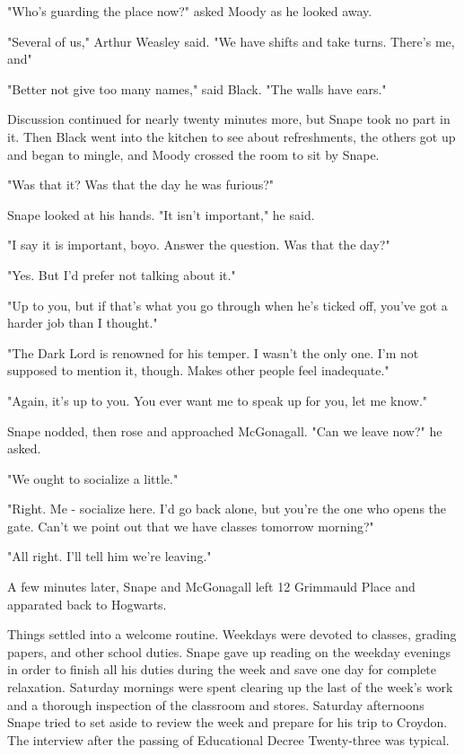 "Who's guarding the place now?" asked Moody as he looked away.

"Several of us," Arthur Weasley said. "We have shifts and take turns. There's me, and{\el}"

"Better not give too many names," said Black. "The walls have ears."

Discussion continued for nearly twenty minutes more, but Snape took no part in it. Then Black went into the kitchen to see about refreshments, the others got up and began to mingle, and Moody crossed the room to sit by Snape.

"Was that it? Was that the day he was furious?"

Snape looked at his hands. "It isn't important," he said.

"I say it is important, boyo. Answer the question. Was that the day?"

"Yes. But I'd prefer not talking about it."

"Up to you, but if that's what you go through when he's ticked off, you've got a harder job than I thought."

"The Dark Lord is renowned for his temper. I wasn't the only one. I'm not supposed to mention it, though. Makes other people feel inadequate."

"Again, it's up to you. You ever want me to speak up for you, let me know."

Snape nodded, then rose and approached McGonagall. "Can we leave now?" he asked.

"We ought to socialize a little."

"Right. Me - socialize here. I'd go back alone, but you're the one who opens the gate. Can't we point out that we have classes tomorrow morning?"

"All right. I'll tell him we're leaving."

A few minutes later, Snape and McGonagall left 12 Grimmauld Place and apparated back to Hogwarts.

\sbreak

Things settled into a welcome routine. Weekdays were devoted to classes, grading papers, and other school duties. Snape gave up reading on the weekday evenings in order to finish all his duties during the week and save one day for complete relaxation. Saturday mornings were spent clearing up the last of the week's work and a thorough inspection of the classroom and stores. Saturday afternoons Snape tried to set aside to review the week and prepare for his trip to Croydon. The interview after the passing of Educational Decree Twenty-three was typical.

